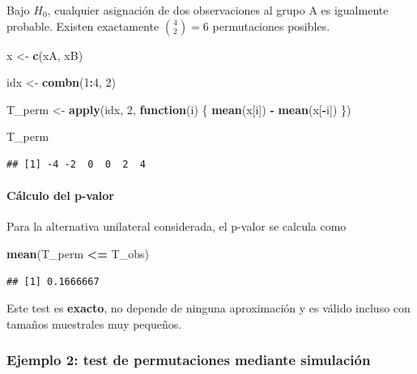 \documentclass[
]{article}
\newenvironment{Shaded}{\begin{snugshade}}{\end{snugshade}}
\newcommand{\ControlFlowTok}[1]{\textcolor[rgb]{0.13,0.29,0.53}{\textbf{#1}}}
\newcommand{\DecValTok}[1]{\textcolor[rgb]{0.00,0.00,0.81}{#1}}
\newcommand{\FunctionTok}[1]{\textcolor[rgb]{0.13,0.29,0.53}{\textbf{#1}}}
\newcommand{\NormalTok}[1]{#1}
\newcommand{\OtherTok}[1]{\textcolor[rgb]{0.56,0.35,0.01}{#1}}
\newcommand{\SpecialCharTok}[1]{\textcolor[rgb]{0.81,0.36,0.00}{\textbf{#1}}}
\begin{document}
Bajo \(H_0\), cualquier asignación de dos observaciones al grupo A es igualmente probable. Existen exactamente \(\binom{4}{2}=6\) permutaciones posibles.

\begin{Shaded}
\begin{Highlighting}[]
\NormalTok{x }\OtherTok{\textless{}{-}} \FunctionTok{c}\NormalTok{(xA, xB)}

\NormalTok{idx }\OtherTok{\textless{}{-}} \FunctionTok{combn}\NormalTok{(}\DecValTok{1}\SpecialCharTok{:}\DecValTok{4}\NormalTok{, }\DecValTok{2}\NormalTok{)}

\NormalTok{T\_perm }\OtherTok{\textless{}{-}} \FunctionTok{apply}\NormalTok{(idx, }\DecValTok{2}\NormalTok{, }\ControlFlowTok{function}\NormalTok{(i) \{}
  \FunctionTok{mean}\NormalTok{(x[i]) }\SpecialCharTok{{-}} \FunctionTok{mean}\NormalTok{(x[}\SpecialCharTok{{-}}\NormalTok{i])}
\NormalTok{\})}

\NormalTok{T\_perm}
\end{Highlighting}
\end{Shaded}

\begin{verbatim}
## [1] -4 -2  0  0  2  4
\end{verbatim}

\paragraph{Cálculo del p-valor}\label{cuxe1lculo-del-p-valor}

Para la alternativa unilateral considerada, el p-valor se calcula como

\begin{Shaded}
\begin{Highlighting}[]
\FunctionTok{mean}\NormalTok{(T\_perm }\SpecialCharTok{\textless{}=}\NormalTok{ T\_obs)}
\end{Highlighting}
\end{Shaded}

\begin{verbatim}
## [1] 0.1666667
\end{verbatim}

Este test es \textbf{exacto}, no depende de ninguna aproximación y es válido incluso con tamaños muestrales muy pequeños.

\subsubsection{Ejemplo 2: test de permutaciones mediante simulación}\label{ejemplo-2-test-de-permutaciones-mediante-simulaciuxf3n}
\end{document}
